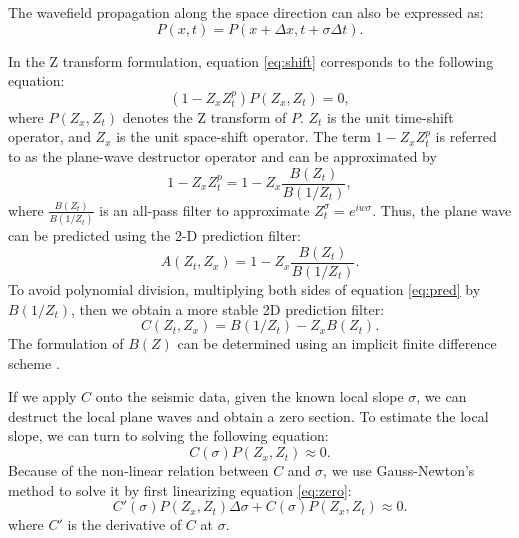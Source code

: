 The wavefield propagation along the space direction can also be expressed as:
\begin{equation}
\label{eq:shift}
P(x,t)=P(x+\Delta x,t+\sigma\Delta t).
\end{equation}

In the Z transform formulation, equation \ref{eq:shift} corresponds to the following equation:
\begin{equation}
\label{eq:zt}
(1-Z_xZ_t^p)P(Z_x,Z_t)=0,
\end{equation}
where $P(Z_x,Z_t)$ denotes the Z transform of $P$. $Z_t$ is the unit time-shift operator, and $Z_x$ is the unit space-shift operator.
The term $1-Z_xZ_t^p$ is referred to as the plane-wave destructor operator and can be approximated by
\begin{equation}
\label{eq:pwd}
1-Z_xZ_t^p = 1- Z_x \frac{B(Z_t)}{B(1/Z_t)},
\end{equation}
where $\frac{B(Z_t)}{B(1/Z_t)}$ is an all-pass filter to approximate $Z_t^{\sigma}=e^{iw\sigma}$.
Thus, the plane wave can be predicted using the 2-D prediction filter:
\begin{equation}
\label{eq:pred}
A(Z_t,Z_x) = 1- Z_x\frac{B(Z_t)}{B(1/Z_t)}.
\end{equation}
To avoid polynomial division, multiplying both sides of equation \ref{eq:pred} by $B(1/Z_t)$, then we obtain a more stable 2D prediction filter:
\begin{equation}
\label{eq:pred2}
C(Z_t,Z_x) = B(1/Z_t)- Z_xB(Z_t).
\end{equation}
The formulation of $B(Z)$ can be determined using an implicit finite difference scheme \cite{fomel2002pwd}.

If we apply $C$ onto the seismic data, given the known local slope $\sigma$, we can destruct the local plane waves and obtain a zero section.
To estimate the local slope, we can turn to solving the following equation:
\begin{equation}
\label{eq:zero}
C(\sigma)P(Z_x,Z_t) \approx 0.
\end{equation}
Because of the non-linear relation between $C$ and $\sigma$, we use Gauss-Newton's method to solve it by first linearizing equation \ref{eq:zero}:
\begin{equation}
\label{eq:linear}
C'(\sigma)P(Z_x,Z_t)\Delta \sigma  + C(\sigma)P(Z_x,Z_t) \approx 0.
\end{equation}
where $C'$ is the derivative of $C$ at $\sigma$.

